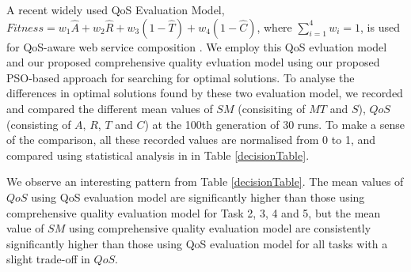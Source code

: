 \documentclass{llncs}
\begin{document}
A recent widely used QoS Evaluation Model, $Fitness = w_1 \hat{A} + w_2 \hat{R} + w_3(1 - \hat{T}) + w_4(1 - \hat{C})$, where $\sum_{i=1}^{4} w_i = 1$, is used for QoS-aware web service composition \cite{ma2015hybrid,da2016particle,da2015graphevol}. We employ this QoS evluation model and our proposed comprehensive quality evluation model using our proposed PSO-based approach for searching for optimal solutions.
To analyse the differences in optimal solutions found by these two evaluation model, we recorded and compared the different mean values of $SM$ (consisiting of $MT$ and $S$), $QoS$(consisting of $A$, $R$, $T$ and $C$) at the 100th generation of 30 runs. To make a sense of the comparison, all these recorded values are normalised from 0 to 1, and compared using statistical analysis in in Table \ref{decisionTable}. 

We observe an interesting pattern from Table \ref{decisionTable}. The mean values of $QoS$ using QoS evaluation model are significantly higher than those using comprehensive quality evaluation model for Task 2, 3, 4 and 5,  but the mean value of $SM$ using comprehensive quality evaluation model are consistently significantly higher than those using QoS evaluation model for all tasks with a slight trade-off in $QoS$.
\end{document}

